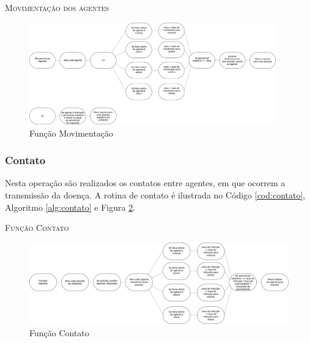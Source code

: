 

\begin{algorithm}[H]
  \SetAlgoLined   
  
  \caption{\textsc{Movimentação dos agentes}}
  \label{alg:movimentacao}
\end{algorithm}

\begin{figure}[H]
  \centering
  \includegraphics[width=0.95\textwidth]{Figuras/EstruturasDadosEstrategias/Operadores/Movimentacao.eps}
  \caption{Função Movimentação}
  \label{fig:movimentacao}
\end{figure} 

\newpage

\subsubsection{Contato}

Nesta operação são realizados os contatos entre agentes, em que ocorrem a transmissão da doença. A rotina de contato é ilustrada no Código \ref{cod:contato}, Algoritmo \ref{alg:contato} e Figura \ref{fig:contato}. 



\begin{algorithm}[H]
 \SetAlgoLined  
 
 \caption{\textsc{Função Contato}} 
 \label{alg:contato}
\end{algorithm}

\begin{figure}[H]
  \centering
  \includegraphics[width=1\textwidth]{Figuras/EstruturasDadosEstrategias/Operadores/Contato.eps}
  \caption{Função Contato}
  \label{fig:contato}
\end{figure} 

